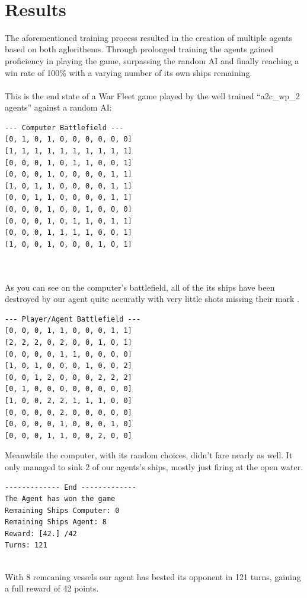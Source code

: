 \documentclass[sigconf]{acmart}
\begin{document}
\\

 \section{Results}
 The aforementioned training process resulted in the creation of multiple agents based on both aglorithems. Through prolonged training the agents gained proficiency in playing the game, surpassing the random AI and finally reaching a win rate of 100\% with a varying number of its own ships remaining.
 \\
 \\
This is the end state of a War Fleet game played by the well trained ``a2c\_wp\_2 agents'' against a random AI:

\begin{lstlisting}
--- Computer Battlefield ---
[0, 1, 0, 1, 0, 0, 0, 0, 0, 0]
[1, 1, 1, 1, 1, 1, 1, 1, 1, 1]
[0, 0, 0, 1, 0, 1, 1, 0, 0, 1]
[0, 0, 0, 1, 0, 0, 0, 0, 1, 1]
[1, 0, 1, 1, 0, 0, 0, 0, 1, 1] 
[0, 0, 1, 1, 0, 0, 0, 0, 1, 1] 
[0, 0, 0, 1, 0, 0, 1, 0, 0, 0] 
[0, 0, 0, 1, 0, 1, 1, 0, 1, 1] 
[0, 0, 0, 1, 1, 1, 1, 0, 0, 1] 
[1, 0, 0, 1, 0, 0, 0, 1, 0, 1] 
\end{lstlisting}
\\
\\
As you can see on the computer's battlefield, all of the its ships have been destroyed by our agent quite accuratly with very little shots missing their mark .
\begin{lstlisting}
--- Player/Agent Battlefield ---
[0, 0, 0, 1, 1, 0, 0, 0, 1, 1]
[2, 2, 2, 0, 2, 0, 0, 1, 0, 1]
[0, 0, 0, 0, 1, 1, 0, 0, 0, 0] 
[1, 0, 1, 0, 0, 0, 1, 0, 0, 2]
[0, 0, 1, 2, 0, 0, 0, 2, 2, 2]
[0, 1, 0, 0, 0, 0, 0, 0, 0, 0]
[1, 0, 0, 2, 2, 1, 1, 1, 0, 0]
[0, 0, 0, 0, 2, 0, 0, 0, 0, 0]
[0, 0, 0, 0, 1, 0, 0, 0, 1, 0]
[0, 0, 0, 1, 1, 0, 0, 2, 0, 0]
\end{lstlisting}
Meanwhile the computer, with its random choices, didn't fare nearly as well. It only managed to sink 2 of our agents's ships, mostly just firing at the open water.
\\
\begin{lstlisting}
------------- End -------------
The Agent has won the game
Remaining Ships Computer: 0
Remaining Ships Agent: 8
Reward: [42.] /42
Turns: 121
\end{lstlisting}
\\
With 8 remeaning vessels our agent has bested its opponent in 121 turns, gaining a full reward of 42 points.
\\
\end{document}
